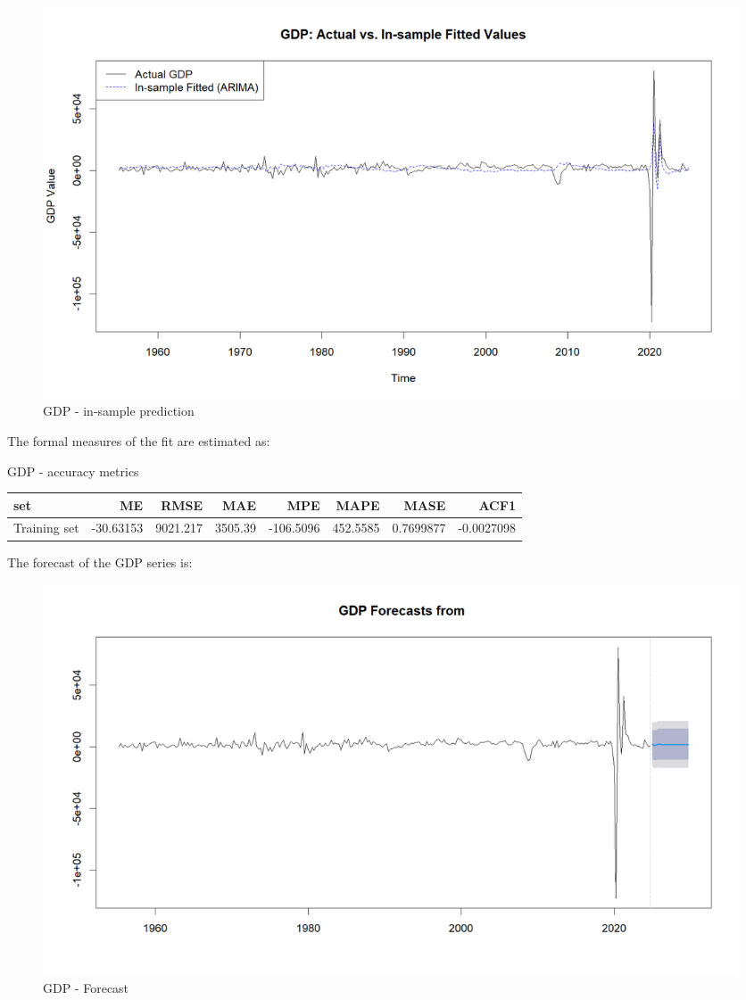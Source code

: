 \documentclass[
]{article}
\begin{document}
\begin{figure}

{\centering \includegraphics[width=0.8\linewidth]{../results/GDP_fitted_vs_actual} 

}

\caption{GDP - in-sample prediction}\label{fig:unnamed-chunk-14}
\end{figure}

The formal measures of the fit are estimated as:

\bgroup \table[H]
\centering
\caption{\label{tab:unnamed-chunk-15}GDP - accuracy metrics}
\centering
\begin{tabular}[t]{lrrrrrrr}
\toprule
set & ME & RMSE & MAE & MPE & MAPE & MASE & ACF1\\
\midrule
Training set & -30.63153 & 9021.217 & 3505.39 & -106.5096 & 452.5585 & 0.7699877 & -0.0027098\\
\bottomrule
\end{tabular}
\endtable\egroup

The forecast of the GDP series is:

\begin{figure}

{\centering \includegraphics[width=0.8\linewidth]{../results/GDP_forecast} 

}

\caption{GDP - Forecast}\label{fig:unnamed-chunk-16}
\end{figure}
\end{document}
